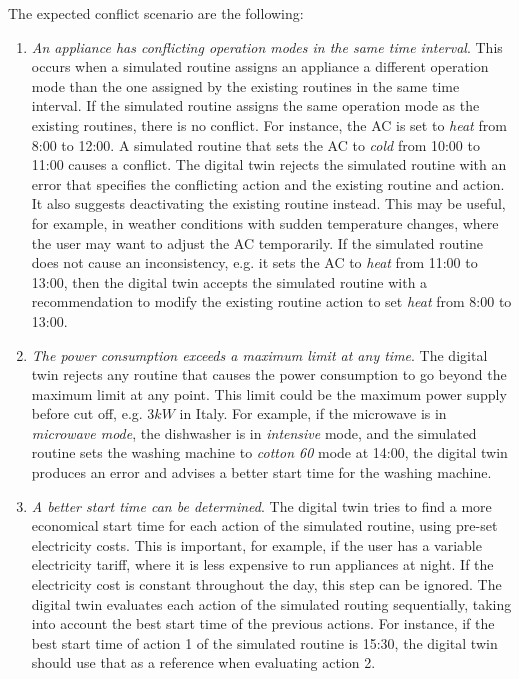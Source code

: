 The expected conflict scenario are the following:
\begin{enumerate}[label={\textit{S\arabic*.}}, leftmargin=3.5em]
    \item \textit{An appliance has conflicting operation modes in the same time interval}. This occurs when a simulated routine assigns an appliance a different operation mode than the one assigned by the existing routines in the same time interval. If the simulated routine assigns the same operation mode as the existing routines, there is no conflict. For instance, the AC is set to \textit{heat} from 8:00 to 12:00. A simulated routine that sets the AC to \textit{cold} from 10:00 to 11:00 causes a conflict. The digital twin rejects the simulated routine with an error that specifies the conflicting action and the existing routine and action. It also suggests deactivating the existing routine instead. This may be useful, for example, in weather conditions with sudden temperature changes, where the user may want to adjust the AC temporarily. If the simulated routine does not cause an inconsistency, e.g. it sets the AC to \textit{heat} from 11:00 to 13:00, then the digital twin accepts the simulated routine with a recommendation to modify the existing routine action to set \textit{heat} from 8:00 to 13:00.

    \item \textit{The power consumption exceeds a maximum limit at any time}. The digital twin rejects any routine that causes the power consumption to go beyond the maximum limit at any point. This limit could be the maximum power supply before cut off, e.g. $3kW$ in Italy. For example, if the microwave is in \textit{microwave mode}, the dishwasher is in \textit{intensive} mode, and the simulated routine sets the washing machine to \textit{cotton 60} mode at 14:00, the digital twin produces an error and advises a better start time for the washing machine.

    \item \textit{A better start time can be determined}. The digital twin tries to find a more economical start time for each action of the simulated routine, using pre-set electricity costs. This is important, for example, if the user has a variable electricity tariff, where it is less expensive to run appliances at night. If the electricity cost is constant throughout the day, this step can be ignored. The digital twin evaluates each action of the simulated routing sequentially, taking into account the best start time of the previous actions. For instance, if the best start time of action 1 of the simulated routine is 15:30, the digital twin should use that as a reference when evaluating action 2.


\end{enumerate}
